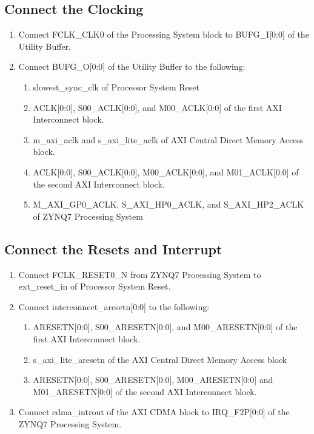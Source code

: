 \subsection{Connect the Clocking}
\begin{enumerate}
\item Connect FCLK\_CLK0 of the Processing System block to BUFG\_I[0:0] of the Utility Buffer.
\item Connect BUFG\_O[0:0] of the Utility Buffer to the following:
\begin{enumerate}
\item slowest\_sync\_clk of Processor System Reset
\item ACLK[0:0], S00\_ACLK[0:0], and M00\_ACLK[0:0] of the first AXI Interconnect block.
\item m\_axi\_aclk and s\_axi\_lite\_aclk of AXI Central Direct Memory Access block.
\item ACLK[0:0], S00\_ACLK[0:0], M00\_ACLK[0:0], and M01\_ACLK[0:0] of the second AXI Interconnect block.
\item M\_AXI\_GP0\_ACLK, S\_AXI\_HP0\_ACLK, and S\_AXI\_HP2\_ACLK of ZYNQ7 Processing System
\end{enumerate}
\end{enumerate}

\subsection{Connect the Resets and Interrupt}
\begin{enumerate}
\item Connect FCLK\_RESET0\_N from ZYNQ7 Processing System to ext\_reset\_in of Processor System Reset.
\item Connect interconnect\_aresetn[0:0] to the following:
\begin{enumerate}
\item ARESETN[0:0], S00\_ARESETN[0:0], and M00\_ARESETN[0:0] of the first AXI Interconnect block.
\item s\_axi\_lite\_aresetn of the AXI Central Direct Memory Access block
\item ARESETN[0:0], S00\_ARESETN[0:0], M00\_ARESETN[0:0] and M01\_ARESETN[0:0] of the second AXI Interconnect block.
\end{enumerate}
\item Connect cdma\_introut of the AXI CDMA block to IRQ\_F2P[0:0] of the ZYNQ7 Processing System.
\end{enumerate}

